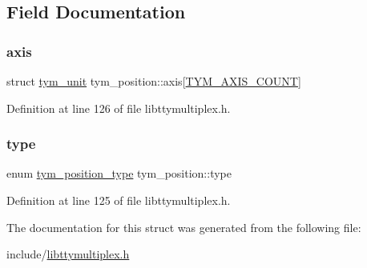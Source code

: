 \subsection{Field Documentation}
\mbox{\label{structtym__position_a1973e10af9a7a40d13da23ea6ec75b71}} 
\subsubsection{\texorpdfstring{axis}{axis}}
{\footnotesize\ttfamily struct \hyperlink{structtym__unit}{tym\+\_\+unit} tym\+\_\+position\+::axis\mbox{[}\hyperlink{libttymultiplex_8h_a6b9111693b9da18b1f567760f5bc17beab5ce57254240d63c232aba1d7552322f}{T\+Y\+M\+\_\+\+A\+X\+I\+S\+\_\+\+C\+O\+U\+NT}\mbox{]}}



Definition at line 126 of file libttymultiplex.\+h.

\mbox{\label{structtym__position_a71682a3bc5e8e9e67f3cfadf0768d73d}} 
\subsubsection{\texorpdfstring{type}{type}}
{\footnotesize\ttfamily enum \hyperlink{libttymultiplex_8h_a23b539c9dc1c137633f8783517fc2653}{tym\+\_\+position\+\_\+type} tym\+\_\+position\+::type}



Definition at line 125 of file libttymultiplex.\+h.



The documentation for this struct was generated from the following file\+:\begin{DoxyCompactItemize}
\item 
include/\hyperlink{libttymultiplex_8h}{libttymultiplex.\+h}\end{DoxyCompactItemize}

